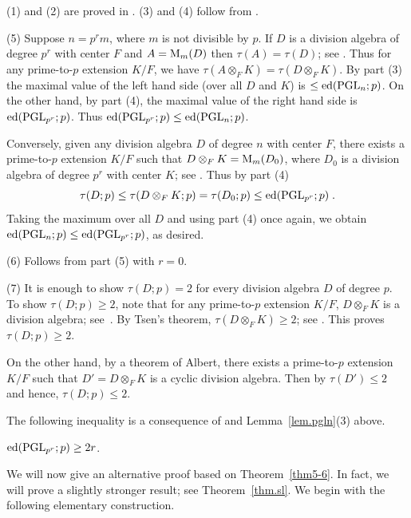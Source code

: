 \begin{pf} (1) and (2) are proved in \cite[Lemma 9.2]{r2}. (3) and (4)
follow from \cite[Lemma~9.1, Proposition~8.6 and Theorem~8.8(a)]{r2}.

\smallskip
(5) Suppose $n = p^r m$, where $m$ is not divisible by $p$. 
If $D$ is a division
algebra of degree $p^r$ with center $F$ and $A = \operatorname{M}_m(D)$
then $\tau(A) = \tau(D)$; see
\cite[Lemma 9.7]{r2}. Thus for any prime-to-$p$ extension $K/F$, 
we have $\tau(A \otimes_F K) = \tau(D \otimes_F K)$. By part
(3) the maximal value of the left hand side (over all $D$ and $K$)
is $\leq \operatorname{ed}(\operatorname{PGL}_n; p)$. On the other hand, by part (4), the maximal
value of the right hand side is $\operatorname{ed}(\operatorname{PGL}_{p^r}; p)$. Thus 
$\operatorname{ed}(\operatorname{PGL}_{p^r}; p) \leq \operatorname{ed}(\operatorname{PGL}_n; p)$.

Conversely, given any division algebra $D$ of degree
$n$ with center $F$, there exists a prime-to-$p$ extension $K/F$
such that $D \otimes _F K = \operatorname{M}_m(D_0)$, where $D_0$ is a division
algebra of degree $p^r$ with center $K$; see \cite[Theorem 3.1.21]{rowen}.
Thus by part (4)
\[ \tau(D; p) \leq 
\tau(D \otimes_F K; p) = \tau(D_0 ; p) \leq \operatorname{ed}(\operatorname{PGL}_{p^r}; p) \; .\]
Taking the maximum over all $D$ and using part (4) once again, 
we obtain $\operatorname{ed}(\operatorname{PGL}_n; p) \leq 
\operatorname{ed}(\operatorname{PGL}_{p^r}; p)$, as desired.

\smallskip
(6) Follows from part (5) with $r = 0$.

\smallskip
(7) It is enough to show $\tau(D; p) = 2$ for every division algebra $D$
of degree $p$. To show $\tau(D; p) \geq 2$, note that  
for any prime-to-$p$ extension $K/F$, $D \otimes _F K$ is 
a division algebra; see~\cite[Corollary 3.1.19]{rowen}. By Tsen's theorem, 
$\tau(D \otimes_F K) \geq 2$; see \cite[Lemma 9.4(a)]{r2}. 
This proves $\tau(D; p) \geq 2$.

On the other hand,
by a theorem of Albert, there exists a prime-to-$p$ extension $K/F$ 
such that $D' = D \otimes_F K$ is a cyclic division algebra. 
Then by \cite[Lemma 9.4(b)]{r2} $\tau(D') \leq 2$ and hence,
$\tau(D; p) \leq 2$. 
\end{pf}

The following inequality is a consequence of \cite[Theorem 16.1(b)]{joubert}
and Lemma~\ref{lem.pgln}(3) above.  

\begin{thm} \label{thm.pgln}
$\operatorname{ed}(\operatorname{PGL}_{p^r}; p) \geq 2r$.
\end{thm}

We will now give an alternative proof based on Theorem~\ref{thm5-6}. 
In fact, we will prove a slightly stronger result; see Theorem~\ref{thm.sl}. 
We begin with the following elementary construction.

